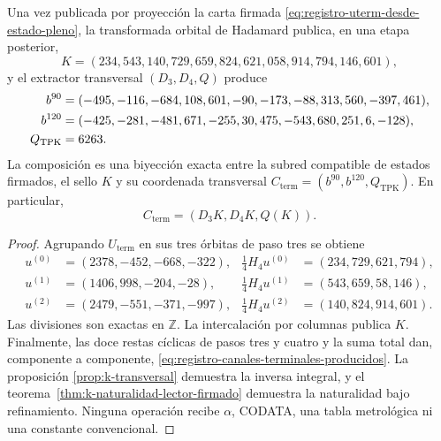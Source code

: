 \begin{theorem}
\label{thm:registro-evaluacion-terminal-recuperada}
Una vez publicada por proyección la carta firmada
\eqref{eq:registro-uterm-desde-estado-pleno}, la transformada orbital de
Hadamard publica, en una etapa posterior,
\[
 K=(234,543,140,729,659,824,621,058,914,794,146,601),
\]
y el extractor transversal \((D_3,D_4,Q)\) produce
\begin{align}
 b^{90}={}&(-495,-116,-684,108,601,-90,
             -173,-88,313,560,-397,461),\notag\\
 b^{120}={}&(-425,-281,-481,671,-255,30,
              475,-543,680,251,6,-128),\notag\\
 Q_{\mathrm{TPK}}={}&6263.
 \label{eq:registro-canales-terminales-producidos}
\end{align}
La composición es una biyección exacta entre la subred compatible de estados
firmados, el sello \(K\) y su coordenada transversal
\(C_{\mathrm{term}}=(b^{90},b^{120},Q_{\mathrm{TPK}})\).
En particular,
\begin{equation}
 C_{\mathrm{term}}=(D_3K,D_4K,Q(K)).
 \label{eq:registro-cterm-desde-xterm}
\end{equation}
\end{theorem}

\begin{proof}
Agrupando \(U_{\mathrm{term}}\) en sus tres órbitas de paso tres se obtiene
\[
 \begin{aligned}
  u^{(0)}&=(2378,-452,-668,-322),&
  \tfrac14H_4u^{(0)}&=(234,729,621,794),\\
  u^{(1)}&=(1406,998,-204,-28),&
  \tfrac14H_4u^{(1)}&=(543,659,58,146),\\
  u^{(2)}&=(2479,-551,-371,-997),&
  \tfrac14H_4u^{(2)}&=(140,824,914,601).
 \end{aligned}
\]
Las divisiones son exactas en \(\mathbb Z\).
La intercalación por columnas publica \(K\). Finalmente, las doce restas
cíclicas de pasos tres y cuatro y la suma total dan, componente a componente,
\eqref{eq:registro-canales-terminales-producidos}. La proposición
\ref{prop:k-transversal} demuestra la inversa integral, y el
teorema~\ref{thm:k-naturalidad-lector-firmado} demuestra la naturalidad bajo
refinamiento. Ninguna operación recibe \(\alpha\), CODATA, una tabla
metrológica ni una constante convencional.
\end{proof}

